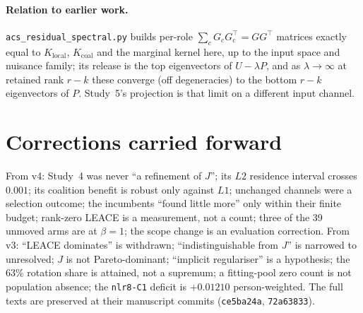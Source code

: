 \documentclass[10pt]{article}
\begin{document}
\paragraph{Relation to earlier work.} \texttt{acs\_residual\_spectral.py} builds per-role
$\sum_cG_cG_c^\top=GG^\top$ matrices exactly equal to $K_{\mathrm{local}}$, $K_{\mathrm{coal}}$ and the marginal
kernel here, up to the input space and nuisance family; its release is the top eigenvectors of $U-\lambda P$, and
as $\lambda\to\infty$ at retained rank $r-k$ these converge (off degeneracies) to the bottom $r-k$ eigenvectors of
$P$. Study~5's projection is that limit on a different input channel.

\section{Corrections carried forward}
\label{app:carried}
\noindent From v4: Study~4 was never ``a refinement of $J$''; its $L2$ residence interval crosses $0.001$; its
coalition benefit is robust only against $L1$; unchanged channels were a selection outcome; the incumbents
``found little more'' only within their finite budget; rank-zero LEACE is a measurement, not a count; three of
the 39 unmoved arms are at $\beta=1$; the scope change is an evaluation correction. From v3: ``LEACE dominates''
is withdrawn; ``indistinguishable from $J$'' is narrowed to unresolved; $J$ is not Pareto-dominant; ``implicit
regulariser'' is a hypothesis; the $63\%$ rotation share is attained, not a supremum; a fitting-pool zero count
is not population absence; the \texttt{nlr8-C1} deficit is $+0.01210$ person-weighted. The full texts are
preserved at their manuscript commits (\texttt{ce5ba24a}, \texttt{72a63833}).


\end{document}
